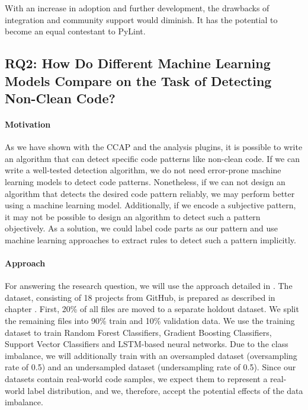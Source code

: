 With an increase in adoption and further development, the drawbacks of integration and community support would diminish. It has the potential to become an equal contestant to PyLint.

\subsection{RQ2: How Do Different Machine Learning Models Compare on the Task of Detecting Non-Clean Code?}\label{rq:2}
\paragraph{Motivation}
As we have shown with the CCAP and the analysis plugins, it is possible to write an algorithm that can detect specific code patterns like non-clean code. If we can write a well-tested detection algorithm, we do not need error-prone machine learning models to detect code patterns. Nonetheless, if we can not design an algorithm that detects the desired code pattern reliably, we may perform better using a machine learning model. Additionally, if we encode a subjective pattern, it may not be possible to design an algorithm to detect such a pattern objectively. As a solution, we could label code parts as our pattern and use machine learning approaches to extract rules to detect such a pattern implicitly.


\paragraph{Approach}\label{par:approach}
For answering the research question, we will use the approach detailed in .  The dataset, consisting of 18 projects from GitHub, is prepared as described in chapter . First, 20\% of all files are moved to a separate holdout dataset. We split the remaining files into 90\% train and 10\% validation data. We use the training dataset to train Random Forest Classifiers, Gradient Boosting Classifiers, Support Vector Classifiers and LSTM-based neural networks. Due to the class imbalance, we will additionally train with an oversampled dataset (oversampling rate of 0.5) and an undersampled dataset (undersampling rate of 0.5). Since our datasets contain real-world code samples, we expect them to represent a real-world label distribution, and we, therefore, accept the potential effects of the data imbalance. 

